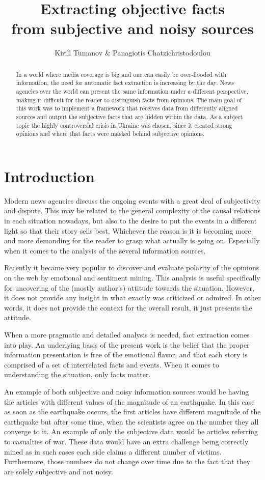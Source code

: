 \documentclass[]{article}
\title{Extracting objective facts \\ from subjective and noisy sources}
\author{Kirill Tumanov \& Panagiotis Chatzichristodoulou}
\begin{document}
\maketitle

\begin{abstract}
In a world where media coverage is big and one can easily be over-flooded with information, the need for automatic fact extraction is increasing by the day. News agencies over the world can present the same information under a different perspective, making it difficult for the reader to distinguish facts from opinions. The main goal of this work was to implement a framework that receives data from differently aligned sources and output the subjective facts that are hidden within the data. As a subject topic the highly controversial crisis in Ukraine was chosen, since it created strong opinions and where that facts were masked behind subjective opinions.
\end{abstract}

%
\section{Introduction}
%
Modern news agencies discuss the ongoing events with a great deal of subjectivity and dispute. This may be related to the general complexity of the causal relations in each situation nowadays, but also to the desire to put the events in a different light so that their story sells best. Whichever the reason is it is becoming more and more demanding for the reader to grasp what actually is going on. Especially when it comes to the analysis of the several information sources.

Recently it became very popular to discover and evaluate polarity of the opinions on the web by emotional and sentiment mining. This analysis is useful specifically for uncovering of the (mostly author's) attitude towards the situation. However, it does not provide any insight in what exactly was criticized or admired. In other words, it does not provide the context for the overall result, it just presents the attitude.

When a more pragmatic and detailed analysis is needed, fact extraction comes into play. An underlying basis of the present work is the belief that the proper information presentation is free of the emotional flavor, and that each story is comprised of a set of interrelated facts and events. When it comes to understanding the situation, only facts matter.

An example of both subjective and noisy information sources would be having the articles with different values of the magnitude of an earthquake. In this case as soon as the earthquake occurs, the first articles have different magnitude of the earthquake but after some time, when the scientists agree on the number they all converge to it. An example of only the subjective data would be articles referring to casualties of war. These data would have an extra challenge being correctly mined as in such cases each side claims a different number of victims. Furthermore, those numbers do not change over time due to the fact that they are solely subjective and not noisy.
\end{document}
